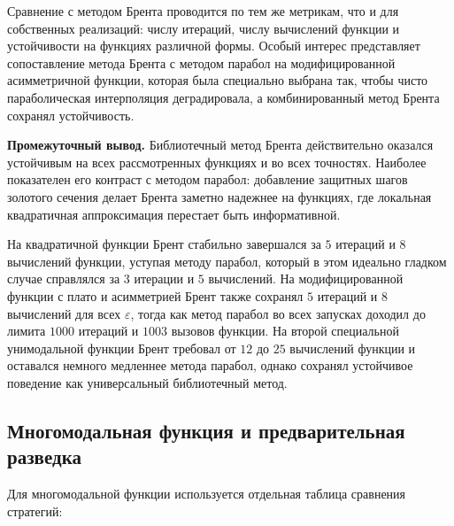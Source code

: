 \documentclass[14pt,a4paper]{extarticle}
\begin{document}
Сравнение с методом Брента проводится по тем же метрикам, что и для собственных реализаций: числу итераций, числу вычислений функции и устойчивости на функциях различной формы. Особый интерес представляет сопоставление метода Брента с методом парабол на модифицированной асимметричной функции, которая была специально выбрана так, чтобы чисто параболическая интерполяция деградировала, а комбинированный метод Брента сохранял устойчивость.

\textbf{Промежуточный вывод.} Библиотечный метод Брента действительно оказался устойчивым на всех рассмотренных функциях и во всех точностях. Наиболее показателен его контраст с методом парабол: добавление защитных шагов золотого сечения делает Брента заметно надежнее на функциях, где локальная квадратичная аппроксимация перестает быть информативной.

На квадратичной функции Брент стабильно завершался за $5$ итераций и $8$ вычислений функции, уступая методу парабол, который в этом идеально гладком случае справлялся за $3$ итерации и $5$ вычислений. На модифицированной функции с плато и асимметрией Брент также сохранял $5$ итераций и $8$ вычислений для всех $\varepsilon$, тогда как метод парабол во всех запусках доходил до лимита $1000$ итераций и $1003$ вызовов функции. На второй специальной унимодальной функции Брент требовал от $12$ до $25$ вычислений функции и оставался немного медленнее метода парабол, однако сохранял устойчивое поведение как универсальный библиотечный метод.

\subsection{Многомодальная функция и предварительная разведка}

Для многомодальной функции используется отдельная таблица сравнения стратегий:
\begin{center}
\end{center}
\end{document}
